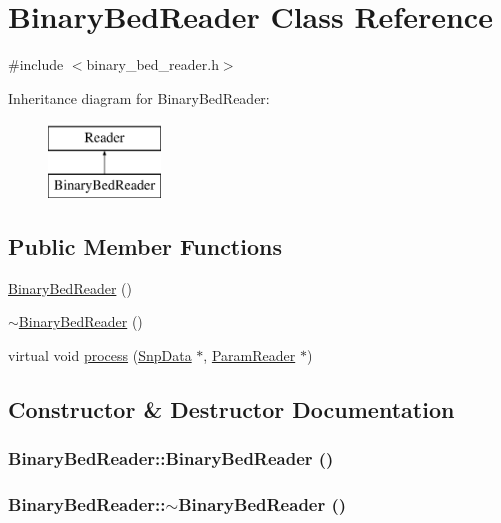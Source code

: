 \hypertarget{classBinaryBedReader}{
\section{BinaryBedReader Class Reference}
\label{classBinaryBedReader}
}


{\ttfamily \#include $<$binary\_\-bed\_\-reader.h$>$}

Inheritance diagram for BinaryBedReader:\begin{figure}[H]
\begin{center}
\leavevmode
\includegraphics[height=2cm]{classBinaryBedReader}
\end{center}
\end{figure}
\subsection*{Public Member Functions}
\begin{DoxyCompactItemize}
\item 
\hyperlink{classBinaryBedReader_a34d61ea79646fbaf3d62c3c1c14b106e}{BinaryBedReader} ()
\item 
\hyperlink{classBinaryBedReader_aec2a611238224f6a436c080dec743c38}{$\sim$BinaryBedReader} ()
\item 
virtual void \hyperlink{classBinaryBedReader_a2132af8b71a683550c19ec4ac3ec3db2}{process} (\hyperlink{classSnpData}{SnpData} $\ast$, \hyperlink{classParamReader}{ParamReader} $\ast$)
\end{DoxyCompactItemize}


\subsection{Constructor \& Destructor Documentation}
\hypertarget{classBinaryBedReader_a34d61ea79646fbaf3d62c3c1c14b106e}{
\subsubsection[{BinaryBedReader}]{\setlength{\rightskip}{0pt plus 5cm}BinaryBedReader::BinaryBedReader ()}}
\label{classBinaryBedReader_a34d61ea79646fbaf3d62c3c1c14b106e}
\hypertarget{classBinaryBedReader_aec2a611238224f6a436c080dec743c38}{
\subsubsection[{$\sim$BinaryBedReader}]{\setlength{\rightskip}{0pt plus 5cm}BinaryBedReader::$\sim$BinaryBedReader ()}}
\label{classBinaryBedReader_aec2a611238224f6a436c080dec743c38}


